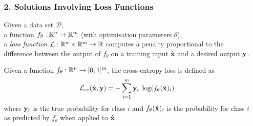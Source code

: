 \documentclass[t,compress,aspectratio=169]{beamer}
\begin{document}
\begin{frame}
  \frametitle{2. Solutions Involving Loss Functions}
    \vspace{-2em}

Given a data set $\mathcal{D} $,\\  a function  ${f_{\theta}: {\mathbb R}^n \rightarrow {\mathbb R}^m}$ (with optimisation parameters $\theta$),\\
	a \emph{loss function} $\mathcal{L}: {\mathbb R}^n \times {\mathbb R}^m \rightarrow {\mathbb R}$ computes a penalty proportional to the difference between the output of $f_{\theta}$ on a training input $\hat{\mathbf{x}}$ and a desired output $\mathbf{y}$.\pause


\begin{example}
	\label{eq:cross-entropy}
	Given a function  ${f_{\theta}: {\mathbb R}^n \rightarrow [0,1]^m}$, the cross-entropy loss is defined as
	\begin{equation}\label{eq:ce}
	\mathcal{L}_{ce}(\hat{\mathbf{x}}, \mathbf{y}) = - \sum_{i=1}^{m} \mathbf{y}_i \; \log(f_{\theta}(\hat{\mathbf{x}})_i)
	\end{equation}
	where $\mathbf{y}_i$ is the true probability for class $i$ and $f_{\theta}(\hat{\mathbf{x}})_i$ is the probability for class $i$ as predicted by $f_{\theta}$ when applied to $\hat{\mathbf{x}}$.
\end{example}

\end{frame}
\end{document}
